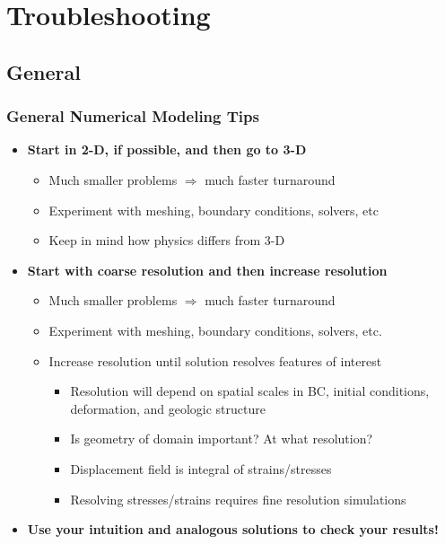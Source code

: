\documentclass{beamer}
\newcommand{\important}[1]{{\bf\color{red}#1}}
\begin{document}
\section{Troubleshooting}
\subsection{General}

\begin{frame}
  \frametitle{General Numerical Modeling Tips}
  
  \begin{itemize}
  \item \important{Start in 2-D, if possible, and then go to 3-D}
    \begin{itemize}
    \item Much smaller problems $\Rightarrow$ much faster turnaround
    \item Experiment with meshing, boundary conditions, solvers, etc
    \item Keep in mind how physics differs from 3-D
    \end{itemize}
  \item \important{Start with coarse resolution and then increase resolution}
    \begin{itemize}
    \item Much smaller problems $\Rightarrow$ much faster turnaround
    \item Experiment with meshing, boundary conditions, solvers, etc.
    \item Increase resolution until solution resolves features of interest
      \begin{itemize}
      \item Resolution will depend on spatial scales in BC, initial
        conditions, deformation, and geologic structure
      \item Is geometry of domain important? At what resolution?
      \item Displacement field is integral of strains/stresses
      \item Resolving stresses/strains requires fine resolution simulations
      \end{itemize}
    \end{itemize}
  \item \important{Use your intuition and analogous solutions to check
      your results!}
  \end{itemize}
  
\end{frame}
\end{document}
